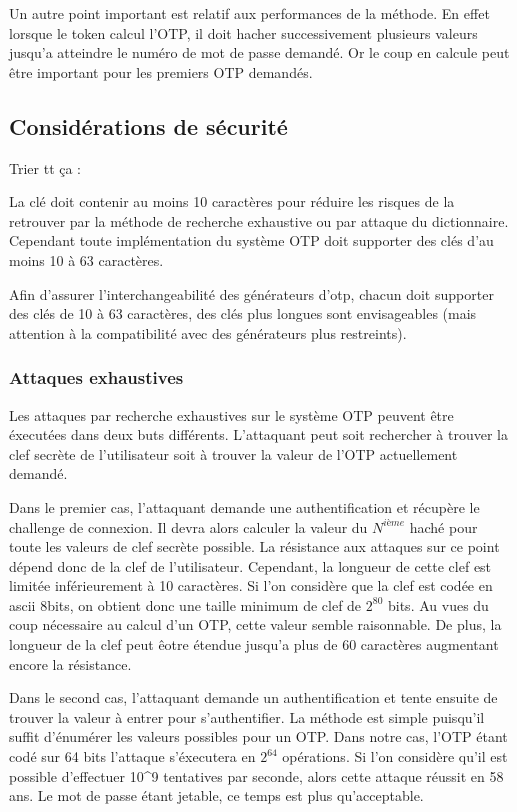 \documentclass{../res/univ-projet}
\begin{document}
  Un autre point important est relatif aux performances de la méthode. En effet
  lorsque le token calcul l'OTP, il doit hacher successivement plusieurs 
  valeurs jusqu'a atteindre le numéro de mot de passe demandé. Or le coup en 
  calcule peut être important pour les premiers OTP demandés.
  
  \subsection{Considérations de sécurité}
    Trier tt ça :

    La clé doit contenir au moins 10 caractères pour réduire les risques de la 
retrouver par la méthode de recherche exhaustive ou par attaque du 
dictionnaire. 
Cependant toute implémentation du système OTP doit supporter des clés d'au 
moins 
10 à 63 caractères.

    Afin d'assurer l'interchangeabilité des générateurs d'otp, chacun doit 
supporter des clés de 10 à 63 caractères, des clés plus longues sont 
envisageables (mais attention à la compatibilité avec des générateurs plus 
restreints).

    \subsubsection{Attaques exhaustives}
    Les attaques par recherche exhaustives sur le système OTP peuvent être 
    éxecutées dans deux buts différents. L'attaquant peut soit rechercher à
    trouver la clef secrète de l'utilisateur soit à trouver la valeur de l'OTP
    actuellement demandé.
    
    Dans le premier cas, l'attaquant demande une authentification et récupère 
    le challenge de connexion. Il devra alors calculer la valeur du $N^{ième}$ 
    haché pour toute les valeurs de clef secrète possible. La résistance aux
    attaques sur ce point dépend donc de la clef de l'utilisateur. Cependant, 
    la longueur de cette clef est limitée inférieurement à 10 caractères. Si
    l'on considère que la clef est codée en ascii 8bits, on obtient donc une 
    taille minimum de clef de $2^{80}$ bits. Au vues du coup nécessaire au 
    calcul d'un OTP, cette valeur semble raisonnable. De plus, la longueur de 
    la clef peut êotre étendue jusqu'a plus de 60 caractères augmentant encore
    la résistance.
    
    Dans le second cas, l'attaquant demande un authentification et tente 
    ensuite de trouver la valeur à entrer pour s'authentifier. La méthode est
    simple puisqu'il suffit d'énumérer les valeurs possibles pour un OTP. Dans
    notre cas, l'OTP étant codé sur 64 bits l'attaque s'éxecutera en $2^{64}$ 
    opérations. Si l'on considère qu'il est possible d'effectuer 10^9 
    tentatives par seconde, alors cette attaque réussit en 58 ans. Le mot de 
    passe étant jetable, ce temps est plus qu'acceptable.
    
\end{document}
